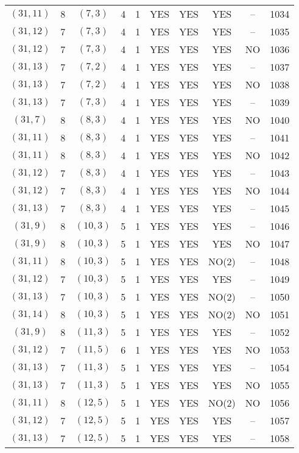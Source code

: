 \begin{longtable}{|c|c|c|c|c|c|c|c|c|c|}
$(31, 11)$ & 8 & $(7, 3)$ & 4 & 1 & YES & YES & YES & -- & 1034\\
$(31, 12)$ & 7 & $(7, 3)$ & 4 & 1 & YES & YES & YES & -- & 1035\\
$(31, 12)$ & 7 & $(7, 3)$ & 4 & 1 & YES & YES & YES & NO & 1036\\
$(31, 13)$ & 7 & $(7, 2)$ & 4 & 1 & YES & YES & YES & -- & 1037\\
$(31, 13)$ & 7 & $(7, 2)$ & 4 & 1 & YES & YES & YES & NO & 1038\\
$(31, 13)$ & 7 & $(7, 3)$ & 4 & 1 & YES & YES & YES & -- & 1039\\
$(31, 7)$ & 8 & $(8, 3)$ & 4 & 1 & YES & YES & YES & NO & 1040\\
$(31, 11)$ & 8 & $(8, 3)$ & 4 & 1 & YES & YES & YES & -- & 1041\\
$(31, 11)$ & 8 & $(8, 3)$ & 4 & 1 & YES & YES & YES & NO & 1042\\
$(31, 12)$ & 7 & $(8, 3)$ & 4 & 1 & YES & YES & YES & -- & 1043\\
$(31, 12)$ & 7 & $(8, 3)$ & 4 & 1 & YES & YES & YES & NO & 1044\\
$(31, 13)$ & 7 & $(8, 3)$ & 4 & 1 & YES & YES & YES & -- & 1045\\
$(31, 9)$ & 8 & $(10, 3)$ & 5 & 1 & YES & YES & YES & -- & 1046\\
$(31, 9)$ & 8 & $(10, 3)$ & 5 & 1 & YES & YES & YES & NO & 1047\\
$(31, 11)$ & 8 & $(10, 3)$ & 5 & 1 & YES & YES & NO(2) & -- & 1048\\
$(31, 12)$ & 7 & $(10, 3)$ & 5 & 1 & YES & YES & YES & -- & 1049\\
$(31, 13)$ & 7 & $(10, 3)$ & 5 & 1 & YES & YES & NO(2) & -- & 1050\\
$(31, 14)$ & 8 & $(10, 3)$ & 5 & 1 & YES & YES & NO(2) & NO & 1051\\
$(31, 9)$ & 8 & $(11, 3)$ & 5 & 1 & YES & YES & YES & -- & 1052\\
$(31, 12)$ & 7 & $(11, 5)$ & 6 & 1 & YES & YES & YES & NO & 1053\\
$(31, 13)$ & 7 & $(11, 3)$ & 5 & 1 & YES & YES & YES & -- & 1054\\
$(31, 13)$ & 7 & $(11, 3)$ & 5 & 1 & YES & YES & YES & NO & 1055\\
$(31, 11)$ & 8 & $(12, 5)$ & 5 & 1 & YES & YES & NO(2) & NO & 1056\\
$(31, 12)$ & 7 & $(12, 5)$ & 5 & 1 & YES & YES & YES & -- & 1057\\
$(31, 13)$ & 7 & $(12, 5)$ & 5 & 1 & YES & YES & YES & -- & 1058\\

\end{longtable}
